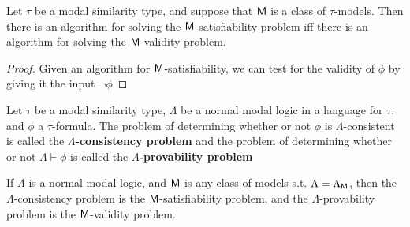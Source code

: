 \documentclass[11pt]{article}
\begin{document}
\begin{lemma}[]
Let \(\tau\) be a modal similarity type, and suppose that \(\textsf{M}\) is a class of
\(\tau\)-models. Then there is an algorithm for solving the
\(\textsf{M}\)-satisfiability problem iff there is an algorithm for solving the
\(\textsf{M}\)-validity problem.
\end{lemma}

\begin{proof}
Given an algorithm for \(\textsf{M}\)-satisfiability, we can test for the validity
of \(\phi\) by giving it the input \(\neg\phi\)
\end{proof}

\begin{definition}[]
Let \(\tau\) be a modal similarity type, \(\Lambda\) be a normal modal logic in a language for
\(\tau\), and \(\phi\) a \(\tau\)-formula. The problem of determining whether or not \(\phi\) is
\(\Lambda\)-consistent is called the \textbf{\(\Lambda\)-consistency problem} and the
problem of determining whether or not \(\Lambda\vdash\phi\) is called the
\textbf{\(\Lambda\)-provability problem}
\end{definition}

If \(\Lambda\) is a normal modal logic, and \(\textsf{M}\) is any class of models s.t.
\(\Lambda=\Lambda_{\textsf{M}}\), then the \(\Lambda\)-consistency problem is the
\(\textsf{M}\)-satisfiability problem, and the \(\Lambda\)-provability problem is
the \(\textsf{M}\)-validity problem.
\end{document}
